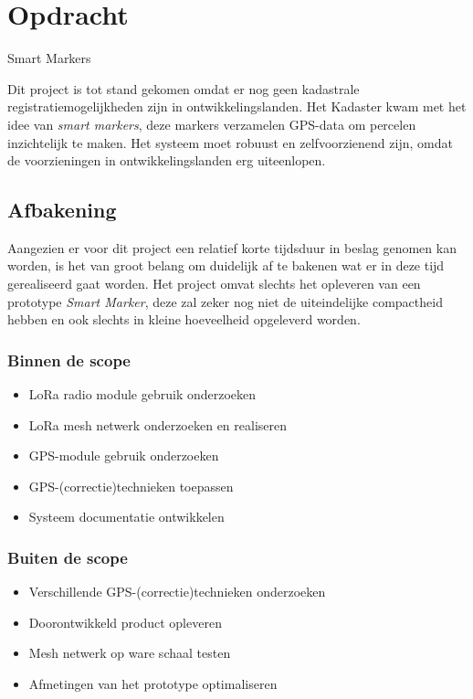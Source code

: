 \section{Opdracht}
\label{sec:opdracht}
Smart Markers

Dit project is tot stand gekomen omdat er nog geen kadastrale registratiemogelijkheden 
zijn in ontwikkelingslanden. Het Kadaster kwam met het idee van \textit{smart markers}, 
deze markers verzamelen GPS-data om percelen inzichtelijk te maken. Het systeem moet 
robuust en zelfvoorzienend zijn, omdat de voorzieningen in ontwikkelingslanden erg 
uiteenlopen.

\subsection{Afbakening}
Aangezien er voor dit project een relatief korte tijdsduur in beslag genomen
kan worden, is het van groot belang om duidelijk af te bakenen wat er in deze
tijd gerealiseerd gaat worden.
Het project omvat slechts het opleveren van een prototype \textit{Smart Marker},
deze zal zeker nog niet de uiteindelijke compactheid hebben en ook slechts in 
kleine hoeveelheid opgeleverd worden.

\subsubsection{Binnen de scope}
\begin{itemize}
    \item LoRa radio module gebruik onderzoeken
    \item LoRa mesh netwerk onderzoeken en realiseren
    \item GPS-module gebruik onderzoeken
    \item GPS-(correctie)technieken toepassen
    \item Systeem documentatie ontwikkelen
\end{itemize}

\subsubsection{Buiten de scope}
\begin{itemize}
    \item Verschillende GPS-(correctie)technieken onderzoeken
    \item Doorontwikkeld product opleveren
    \item Mesh netwerk op ware schaal testen
    \item Afmetingen van het prototype optimaliseren
\end{itemize}

